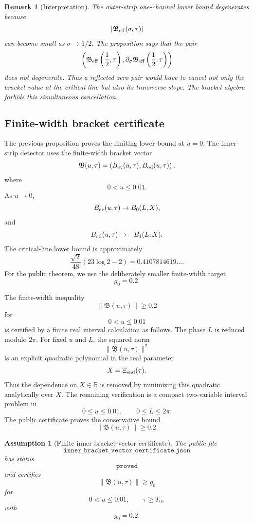 \documentclass[11pt]{article}
\newtheorem{remark}[theorem]{Remark}
\newtheorem{assumption}[theorem]{Assumption}
\newcommand{\Beff}{\mathfrak B_{\rm eff}}
\newcommand{\Bvec}{\mathfrak B}
\newcommand{\gev}{g_0}
\begin{document}
\begin{remark}[Interpretation]
The outer-strip one-channel lower bound degenerates because
\[
        |\Beff(\sigma,\tau)|
\]
can become small as \(\sigma\to1/2\).  The proposition says that the pair
\[
        \left(
        \Beff\left(\frac12,\tau\right),
        \partial_\sigma\Beff\left(\frac12,\tau\right)
        \right)
\]
does not degenerate.  Thus a reflected zero pair would have to cancel not only
the bracket value at the critical line but also its transverse slope.  The
bracket algebra forbids this simultaneous cancellation.
\end{remark}

\subsection{Finite-width bracket certificate}

The previous proposition proves the limiting lower bound at \(u=0\).  The
inner-strip detector uses the finite-width bracket vector
\[
        \Bvec(u,\tau)
        =
        \left(
        B_{\rm ev}(u,\tau),
        B_{\rm od}(u,\tau)
        \right),
\]
where
\[
        0<u\le0.01.
\]
As \(u\to0\),
\[
        B_{\rm ev}(u,\tau)
        \to
        B_0(L,X),
\]
and
\[
        B_{\rm od}(u,\tau)
        \to
        -B_1(L,X).
\]
The critical-line lower bound is approximately
\[
        \frac{\sqrt2}{48}(23\log2-2)
        =
        0.4107814619\ldots.
\]
For the public theorem, we use the deliberately smaller finite-width target
\[
        \gev=0.2.
\]

The finite-width inequality
\[
        \|\Bvec(u,\tau)\|\ge0.2
\]
for
\[
        0<u\le0.01
\]
is certified by a finite real interval calculation as follows.  The phase
\(L\) is reduced modulo \(2\pi\).  For fixed \(u\) and \(L\), the squared norm
\[
        \|\Bvec(u,\tau)\|^2
\]
is an explicit quadratic polynomial in the real parameter
\[
        X=\Xi_{\rm end}(\tau).
\]
Thus the dependence on \(X\in\mathbb R\) is removed by minimizing this
quadratic analytically over \(X\).  The remaining verification is a compact
two-variable interval problem in
\[
        0\le u\le0.01,
        \qquad
        0\le L\le2\pi.
\]
The public certificate proves the conservative bound
\[
        \|\Bvec(u,\tau)\|\ge0.2.
\]

\begin{assumption}[Finite inner bracket-vector certificate]
\label{ass:finite-bracket-vector-certificate}
The public file
\[
        \texttt{inner\_bracket\_vector\_certificate.json}
\]
has status
\[
        \texttt{proved}
\]
and certifies
\[
        \|\Bvec(u,\tau)\|\ge\gev
\]
for
\[
        0<u\le0.01,
        \qquad
        \tau\ge T_0,
\]
with
\[
        \gev=0.2.
\]
\end{assumption}
\end{document}
